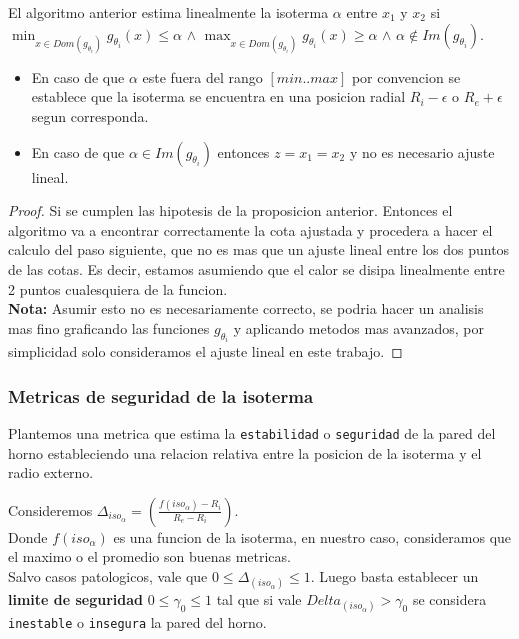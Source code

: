 \begin{proposition}
    El algoritmo anterior estima linealmente la isoterma $\alpha$ entre $x_1$ y $x_2$ si $\displaystyle\min_{x \in Dom(g_{\theta_i})}{g_{\theta_i}(x)} \leq \alpha$ $\land$ $\displaystyle\max_{x \in Dom(g_{\theta_i})}{g_{\theta_i}(x)} \geq \alpha$ $\land$ $\alpha \notin Im(g_{\theta_i})$.\\
    \begin{itemize}
        \item En caso de que $\alpha$ este fuera del rango $[min..max]$ por convencion se establece que la isoterma se encuentra en una posicion radial $R_i - \epsilon$ o $R_e + \epsilon$ segun corresponda.
        \item En caso de que $\alpha \in Im(g_{\theta_i})$ entonces $z = x_1 = x_2$ y no es necesario ajuste lineal.
    \end{itemize}
\end{proposition}
\begin{proof}
    Si se cumplen las hipotesis de la proposicion anterior. Entonces el algoritmo va a encontrar correctamente la cota ajustada y procedera a hacer el calculo del paso siguiente, que no es mas que un ajuste lineal entre los dos puntos de las cotas. Es decir, estamos asumiendo que el calor se disipa linealmente entre 2 puntos cualesquiera de la funcion.\\
    \textbf{Nota:} Asumir esto no es necesariamente correcto, se podria hacer un analisis mas fino graficando las funciones $g_{\theta_i}$ y aplicando metodos mas avanzados, por simplicidad solo consideramos el ajuste lineal en este trabajo.
\end{proof}

\subsubsection{Metricas de seguridad de la isoterma}
Plantemos una metrica que estima la \texttt{estabilidad} o \texttt{seguridad} de la pared del horno estableciendo una relacion relativa entre la posicion de la isoterma y el radio externo. 
\begin{proposition}
    Consideremos $\Delta_{iso_\alpha} = \left( \frac{f(iso_\alpha) - R_i}{R_e - R_i} \right)$.\\
    Donde $f(iso_\alpha)$ es una funcion de la isoterma, en nuestro caso, consideramos que el maximo o el promedio son buenas metricas.\\
    Salvo casos patologicos, vale que $0 \leq \Delta_(iso_\alpha)\leq 1$. Luego basta establecer un \textbf{limite de seguridad} $0 \leq \gamma_0 \leq 1$ tal que si vale $Delta_(iso_\alpha) > \gamma_0$ se considera \texttt{inestable} o \texttt{insegura} la pared del horno.
\end{proposition}


